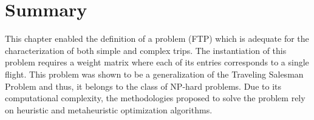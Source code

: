 \section{Summary}
\label{sec:summary_pf}

This chapter enabled the definition of a problem (FTP) which is adequate for the characterization of both simple and complex trips. The instantiation of this problem requires a weight matrix where each of its entries corresponds to a single flight. This problem was shown to be a generalization of the Traveling Salesman Problem and thus, it belongs to the class of NP-hard problems. Due to its computational complexity, the methodologies proposed to solve the problem rely on heuristic and metaheuristic optimization algorithms.